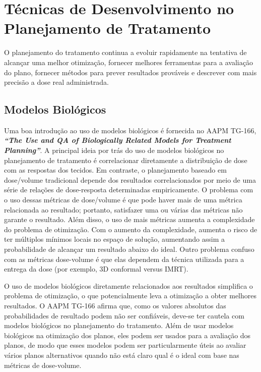 \documentclass[11pt,a4paper]{article}
\newcounter{exemplo}
\begin{document}
\section{Técnicas de Desenvolvimento no Planejamento de Tratamento}

	O planejamento do tratamento continua a evoluir rapidamente na tentativa de alcançar uma melhor otimização, fornecer melhores ferramentas para a avaliação do plano, fornecer métodos para prever resultados prováveis e descrever com mais precisão a dose real administrada.

\subsection*{Modelos Biológicos}

	Uma boa introdução ao uso de modelos biológicos é fornecida no AAPM TG-166, \textbf{\textit{``The Use and QA of Biologically Related Models for Treatment Planning''}}. A principal ideia por trás do uso de modelos biológicos no planejamento de tratamento é correlacionar diretamente a distribuição de dose com as respostas dos tecidos. Em contraste, o planejamento baseado em dose/volume tradicional depende dos resultados correlacionados por meio de uma série de relações de dose-resposta determinadas empiricamente. O problema com o uso dessas métricas de dose/volume é que pode haver mais de uma métrica relacionada ao resultado; portanto, satisfazer uma ou várias das métricas não garante o resultado. Além disso, o uso de mais métricas aumenta a complexidade do problema de otimização. Com o aumento da complexidade, aumenta o risco de ter múltiplos mínimos locais no espaço de solução, aumentando assim a probabilidade de alcançar um resultado abaixo do ideal. Outro problema confuso com as métricas dose-volume é que elas dependem da técnica utilizada para a entrega da dose (por exemplo, 3D conformal versus IMRT).

	O uso de modelos biológicos diretamente relacionados aos resultados simplifica o problema de otimização, o que potencialmente leva a otimização a obter melhores resultados. O AAPM TG-166 afirma que, como os valores absolutos das probabilidades de resultado podem não ser confiáveis, deve-se ter cautela com modelos biológicos no planejamento do tratamento. Além de usar modelos biológicos na otimização dos planos, eles podem ser usados para a avaliação dos planos, de modo que esses modelos podem ser particularmente úteis ao avaliar vários planos alternativos quando não está claro qual é o ideal com base nas métricas de dose-volume.
\end{document}
